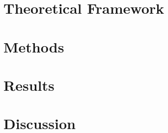 \documentclass[review]{elsarticle}
\begin{document}
\section{Theoretical Framework}

\section{Methods}

\section{Results}

\section{Discussion}



\end{document}
